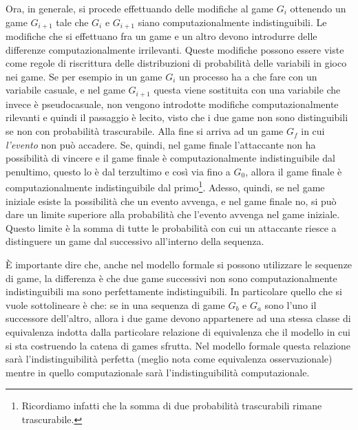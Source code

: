 \documentclass[a4paper,openright,twoside,12pt]{report}
\begin{document}
Ora, in generale, si procede effettuando delle modifiche al game $G_i$ ottenendo un game $G_{i+1}$ 
tale che $G_i$ e $G_{i+1}$ siano computazionalmente indistinguibili. Le modifiche che si effettuano fra un game e un altro devono introdurre delle differenze computazionalmente irrilevanti.
Queste modifiche possono essere viste come regole di riscrittura delle distribuzioni di probabilit\`a delle variabili in gioco nei game.
Se per esempio in un game $G_i$ un processo ha a che fare con un variabile casuale, e nel game $G_{i+1}$ questa viene sostituita con una variabile che invece \`e pseudocasuale, non vengono introdotte
modifiche computazionalmente rilevanti e quindi il passaggio \`e lecito, visto che i due game non sono distinguibili se non con probabilit\`a trascurabile.
Alla fine si arriva ad un game $G_f$ in cui \emph{l'evento} non pu\`o accadere. Se, quindi, nel game finale l'attaccante non ha possibilit\`a di vincere e il game finale
\`e computazionalmente indistinguibile dal penultimo, questo lo \`e dal terzultimo e cos\`i via fino a $G_0$, allora
il game finale \`e computazionalmente indistinguibile dal primo\footnote{Ricordiamo infatti che la somma di due probabilit\`a trascurabili rimane trascurabile.}. 
Adesso, quindi, se nel game iniziale esiste la possibilit\`a che un evento avvenga, e nel game finale no,
si pu\`o dare un limite superiore alla probabilit\`a che l'evento avvenga nel game iniziale. Questo limite \`e la somma di tutte le probabilit\`a con cui un attaccante riesce a distinguere un game dal successivo all'interno della sequenza.

\`E importante dire che, anche nel modello formale si possono utilizzare le sequenze di game, la differenza \`e che due game successivi non sono computazionalmente indistinguibili 
ma sono perfettamente indistinguibili. In particolare quello che si vuole sottolineare \`e che: se in una sequenza di game $G_b$ e $G_a$ sono l'uno il successore dell'altro, 
allora i due game 
devono appartenere ad una stessa classe di equivalenza indotta dalla particolare relazione di equivalenza che il modello in cui si sta costruendo la catena di games sfrutta.
Nel modello formale questa relazione sar\`a l'indistinguibilit\`a perfetta (meglio nota come equivalenza osservazionale) mentre in quello computazionale sar\`a 
l'indistinguibilit\`a computazionale.
\end{document}
